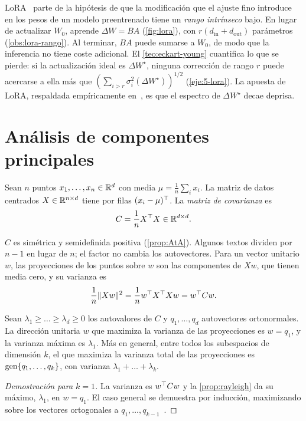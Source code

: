 LoRA~\cite{hu-lora} parte de la hipótesis de que la modificación que el ajuste fino introduce en los pesos de un modelo preentrenado tiene un \emph{rango intrínseco} bajo. En lugar de actualizar $W_0$, aprende $\Delta W=BA$ (\cref{fig:lora}), con $r(d_{\text{in}}+d_{\text{out}})$ parámetros (\cref{obs:lora-rango}). Al terminar, $BA$ puede sumarse a $W_0$, de modo que la inferencia no tiene coste adicional. El \cref{teo:eckart-young} cuantifica lo que se pierde: si la actualización ideal es $\Delta W^{\star}$, ninguna corrección de rango $r$ puede acercarse a ella más que $(\sum_{i>r}\sigma_i^{2}(\Delta W^{\star}))^{1/2}$ (\cref{eje:5-lora}). La apuesta de LoRA, respaldada empíricamente en~\cite{hu-lora}, es que el espectro de $\Delta W^{\star}$ decae deprisa.

\section{Análisis de componentes principales}

\begin{definicion}
Sean $n$ puntos $x_1,\dots,x_n\in\mathbb{R}^{d}$ con media $\mu=\frac1n\sum_ix_i$. La matriz de datos centrados $X\in\mathbb{R}^{n\times d}$ tiene por filas $(x_i-\mu)^{\top}$. La \emph{matriz de covarianza} es
\[
C=\frac{1}{n}X^{\top} X\in\mathbb{R}^{d\times d}.
\]
\end{definicion}

$C$ es simétrica y semidefinida positiva (\cref{prop:AtA}). Algunos textos dividen por $n-1$ en lugar de $n$; el factor no cambia los autovectores. Para un vector unitario $w$, las proyecciones de los puntos sobre $w$ son las componentes de $Xw$, que tienen media cero, y su varianza es
\[
\frac1n\lVert Xw\rVert^{2}=\frac1n w^{\top} X^{\top} Xw=w^{\top} Cw.
\]

\begin{teorema}\label{teo:pca}
Sean $\lambda_1\ge\dots\ge\lambda_d\ge 0$ los autovalores de $C$ y $q_1,\dots,q_d$ autovectores ortonormales. La dirección unitaria $w$ que maximiza la varianza de las proyecciones es $w=q_1$, y la varianza máxima es $\lambda_1$. Más en general, entre todos los subespacios de dimensión $k$, el que maximiza la varianza total de las proyecciones es $\operatorname{gen}\{q_1,\dots,q_k\}$, con varianza $\lambda_1+\dots+\lambda_k$.
\end{teorema}

\begin{proof}[Demostración para $k=1$]
La varianza es $w^{\top} Cw$ y la \cref{prop:rayleigh} da su máximo, $\lambda_1$, en $w=q_1$. El caso general se demuestra por inducción, maximizando sobre los vectores ortogonales a $q_1,\dots,q_{k-1}$~\cite[§10.2.2]{mml}.
\end{proof}

